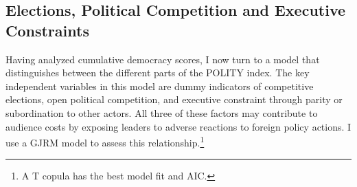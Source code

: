 \documentclass[12pt]{article}
\begin{document}
\subsection{Elections, Political Competition and Executive Constraints} 


Having analyzed cumulative democracy scores, I now turn to a model that distinguishes between the different parts of the POLITY index. 
The key independent variables in this model are dummy indicators of competitive elections, open political competition, and executive constraint through parity or subordination to other actors. 
All three of these factors may contribute to audience costs by exposing leaders to adverse reactions to foreign policy actions. 
I use a GJRM model to assess this relationship.\footnote{A T copula has the best model fit and AIC.} 
\end{document}
